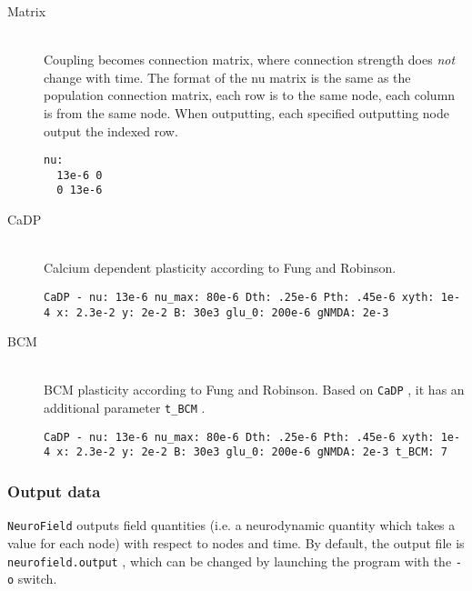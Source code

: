 \documentclass[12pt,a4paper]{article}
\newcommand{\type}[1]{ {\small\small\tt #1} }
\newcommand{\NF}[0]{ \type{NeuroField}}
\begin{document}
\begin{itemize}
\begin{description}
	\item[Matrix]\ \\
	Coupling becomes connection matrix, where connection strength does \emph{not} change with time. The format of the nu matrix is the same as the population connection matrix, each row is to the same node, each column is from the same node. When outputting, each specified outputting node output the indexed row.
	\begin{lstlisting}
nu:
  13e-6 0
  0 13e-6
	\end{lstlisting}

	\item[CaDP]\ \\
	Calcium dependent plasticity according to Fung and Robinson.
	\begin{lstlisting}
CaDP - nu: 13e-6 nu_max: 80e-6 Dth: .25e-6 Pth: .45e-6 xyth: 1e-4 x: 2.3e-2 y: 2e-2 B: 30e3 glu_0: 200e-6 gNMDA: 2e-3
	\end{lstlisting}

	\item[BCM]\ \\
	BCM plasticity according to Fung and Robinson. Based on \type{CaDP}, it has an additional parameter \type{t\_BCM}.
	\begin{lstlisting}
CaDP - nu: 13e-6 nu_max: 80e-6 Dth: .25e-6 Pth: .45e-6 xyth: 1e-4 x: 2.3e-2 y: 2e-2 B: 30e3 glu_0: 200e-6 gNMDA: 2e-3 t_BCM: 7
	\end{lstlisting}

\end{description}
\end{itemize}

\subsubsection{Output data}
\label{sec:output}

\NF outputs field quantities (i.e. a neurodynamic quantity which takes a value for each node) with respect to nodes and time. By default, the output file is \type{neurofield.output}, which can be changed by launching the program with the \type{-o} switch.
\end{document}
